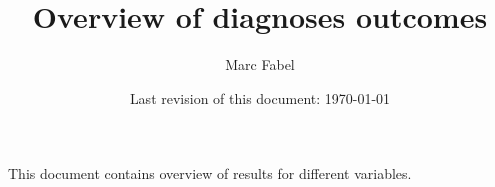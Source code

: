 \documentclass[11pt, a4paper]{scrartcl} %
\author{Marc Fabel}
\title{Overview of diagnoses outcomes}
\date{Last revision of this document: \today}
\begin{document}
\maketitle
This document contains overview of results for different variables. 


%
%
\end{document}
